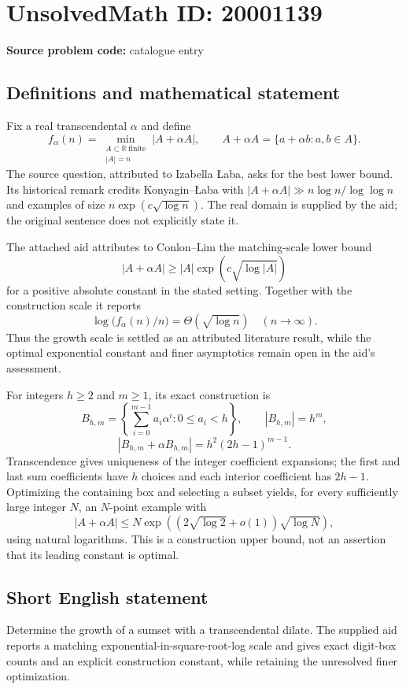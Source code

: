 \documentclass[11pt]{article}
\newcommand{\R}{\mathbb{R}}
\begin{document}
\section*{UnsolvedMath ID: 20001139}
\textbf{Source problem code:} catalogue entry
\subsection{Definitions and mathematical statement}
Fix a real transcendental $\alpha$ and define
\[
f_\alpha(n)=\min_{\substack{A\subset\R\ \mathrm{finite}\\|A|=n}}|A+\alpha A|,\qquad
A+\alpha A=\{a+\alpha b:a,b\in A\}.
\]
The source question, attributed to Izabella \L aba, asks for the best lower bound. Its historical remark credits Konyagin--\L aba with $|A+\alpha A|\gg n\log n/\log\log n$ and examples of size $n\exp(c\sqrt{\log n})$. The real domain is supplied by the aid; the original sentence does not explicitly state it.

The attached aid attributes to Conlon--Lim the matching-scale lower bound
\[
|A+\alpha A|\ge |A|\exp(c\sqrt{\log|A|})
\]
for a positive absolute constant in the stated setting. Together with the construction scale it reports
\[
\log\bigl(f_\alpha(n)/n\bigr)=\Theta(\sqrt{\log n})\quad(n\to\infty).
\]
Thus the growth scale is settled as an attributed literature result, while the optimal exponential constant and finer asymptotics remain open in the aid's assessment.

For integers $h\ge2$ and $m\ge1$, its exact construction is
\[
B_{h,m}=\left\{\sum_{i=0}^{m-1}a_i\alpha^i:0\le a_i<h\right\},\qquad |B_{h,m}|=h^m,
\]
\[
|B_{h,m}+\alpha B_{h,m}|=h^2(2h-1)^{m-1}.
\]
Transcendence gives uniqueness of the integer coefficient expansions; the first and last sum coefficients have $h$ choices and each interior coefficient has $2h-1$. Optimizing the containing box and selecting a subset yields, for every sufficiently large integer $N$, an $N$-point example with
\[
|A+\alpha A|\le N\exp\left((2\sqrt{\log2}+o(1))\sqrt{\log N}\right),
\]
using natural logarithms. This is a construction upper bound, not an assertion that its leading constant is optimal.
\subsection{Short English statement}
Determine the growth of a sumset with a transcendental dilate. The supplied aid reports a matching exponential-in-square-root-log scale and gives exact digit-box counts and an explicit construction constant, while retaining the unresolved finer optimization.
\end{document}
